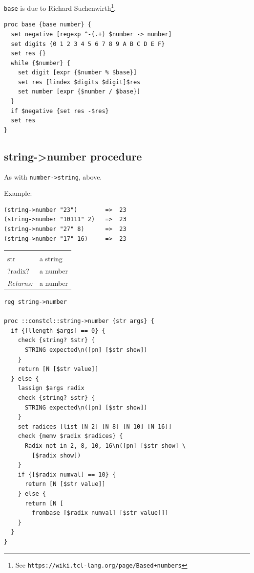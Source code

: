 \documentclass[twoside,9pt]{report}
\begin{document}
\texttt{base} is due to Richard Suchenwirth\footnote{See \texttt{https://wiki.tcl-lang.org/page/Based+numbers}}.

\begin{lstlisting}
proc base {base number} {
  set negative [regexp ^-(.+) $number -> number]
  set digits {0 1 2 3 4 5 6 7 8 9 A B C D E F}
  set res {}
  while {$number} {
    set digit [expr {$number % $base}]
    set res [lindex $digits $digit]$res
    set number [expr {$number / $base}]
  }
  if $negative {set res -$res}
  set res
}
\end{lstlisting}
\subsection{string->number procedure}
\label{string->number-procedure}


As with \texttt{number->string}, above.



Example:

\begin{verbatim}
(string->number "23")        =>  23
(string->number "10111" 2)   =>  23
(string->number "27" 8)      =>  23
(string->number "17" 16)     =>  23
\end{verbatim}
\noindent\begin{tabular}{ |p{1.9cm} p{8cm}| }
\hline
\rowcolor[HTML]{CCCCCC} \multicolumn{2}{|l|}{\bf string->number (public)} \\
str & a string \\
?radix? & a number \\
\textit{Returns:} & a number \\
\hline
\end{tabular}
\begin{lstlisting}
reg string->number

proc ::constcl::string->number {str args} {
  if {[llength $args] == 0} {
    check {string? $str} {
      STRING expected\n([pn] [$str show])
    }
    return [N [$str value]]
  } else {
    lassign $args radix
    check {string? $str} {
      STRING expected\n([pn] [$str show])
    }
    set radices [list [N 2] [N 8] [N 10] [N 16]]
    check {memv $radix $radices} {
      Radix not in 2, 8, 10, 16\n([pn] [$str show] \
        [$radix show])
    }
    if {[$radix numval] == 10} {
      return [N [$str value]]
    } else {
      return [N [
        frombase [$radix numval] [$str value]]]
    }
  }
}
\end{lstlisting}
\end{document}
